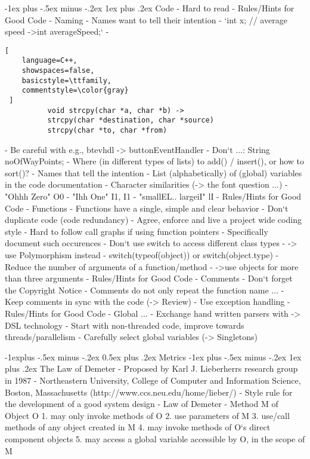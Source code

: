 \documentclass[a4paper]{article}
\makeatletter
\renewcommand{\subsection}{\@startsection{subsection}{2}{0mm}%
                                {-1explus -.5ex minus -.2ex}%
                                {0.5ex plus .2ex}%
                                {\normalfont\normalsize\bfseries}}
\renewcommand{\subsubsection}{\@startsection{subsubsection}{3}{0mm}%
                                {-1ex plus -.5ex minus -.2ex}%
                                {1ex plus .2ex}%
                                {\normalfont\small\bfseries}}
\makeatother
\begin{document}
\begin{multicols}{3}
  \subsubsection{Code - Hard to read }
  - Rules/Hints for Good Code - Naming
      - Names want to tell their intention
          - `int x; // average speed ->int averageSpeed;`
          - 
  \begin{lstlisting}[
    language=C++,
    showspaces=false,
    basicstyle=\ttfamily,
    commentstyle=\color{gray}
 ]
          void strcpy(char *a, char *b) -> 
          strcpy(char *destination, char *source)
          strcpy(char *to, char *from)
          \end{lstlisting}
          - Be careful with e.g., btevhdl -> buttonEventHandler
          - Don‘t ...: String noOfWayPoints;
          - Where (in different types of lists) to add() / insert(), or how to sort()?
      - Names that tell the intention
          - List (alphabetically) of (global) variables in the code documentation
      - Character similarities (-> the font question ...)
          - "Ohhh Zero" O0
          - "Ihh One" I1, I1
          - "smallEL.. largeiI" lI
  - Rules/Hints for Good Code - Functions
      - Functions have a single, simple and clear behavior
      - Don‘t duplicate code (code redundancy)
      - Agree, enforce and live a project wide coding style
      - Hard to follow call graphs if using function pointers
          - Specifically document such occurences
      - Don‘t use switch to access different class types
          - -> use Polymorphism instead
          - switch(typeof(object)) or switch(object.type)
      - Reduce the number of arguments of a function/method
          - ->use objects for more than three arguments
  - Rules/Hints for Good Code - Comments
      - Don‘t forget the Copyright Notice
      - Comments do not only repeat the function name ...
      - Keep comments in sync with the code (-> Review)
      - Use exception handling
  - Rules/Hints for Good Code - Global ...
      - Exchange hand written parsers with -> DSL technology
      - Start with non-threaded code, improve towards threads/parallelism
      - Carefully select global variables (-> Singletons)
  
  \subsection{Metrics}
  \subsubsection{The Law of Demeter}
  - Proposed by Karl J. Lieberherrs research group in 1987
      - Northeastern University, College of Computer and Information Science, Boston, Massachusetts (http://www.ccs.neu.edu/home/lieber/)
      - Style rule for the development of a good system design
  - Law of Demeter %
      - Method M of Object O
          1. may only invoke methods of O
          2. use parameters of M
          3. use/call methods of any object created in M
          4. may invoke methods of O‘s direct component objects
          5. may access a global variable accessible by O, in the scope of M
  

\end{multicols}
\end{document}
